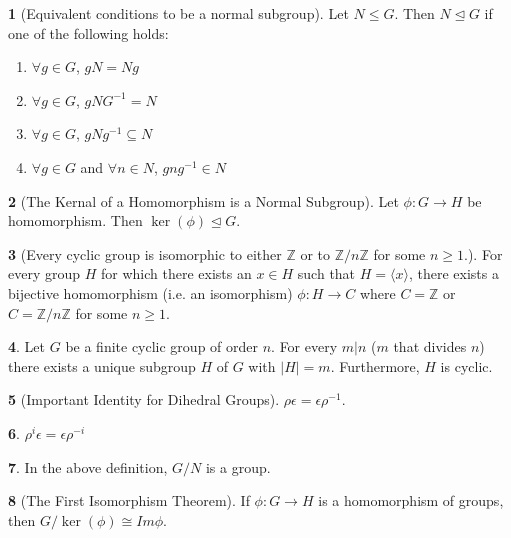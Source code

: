 \documentclass[12pt]{article}
\theoremstyle{definition}
\newtheorem{theorem}{\color{ForestGreen}{\textbf{Theorem}}}
\newcommand{\e}{\epsilon}
\begin{document}
\begin{theorem}[Equivalent conditions to be a normal subgroup]
Let $N \leq G$. Then $N \trianglelefteq G$ if one of the following holds:
\begin{enumerate}
\item $\forall g\in G$, $gN = Ng$
\item $\forall g\in G$, $gNG^{-1} = N$
\item $\forall g\in G$, $gNg^{-1} \subseteq N$
\item $\forall g\in G$ and $\forall n\in N$, $gng^{-1} \in N$
\end{enumerate}
\end{theorem}

\begin{theorem}[The Kernal of a Homomorphism is a Normal Subgroup]
Let $\phi : G \to H$ be homomorphism. Then $\ker (\phi) \trianglelefteq G$.
\end{theorem}

\begin{theorem}[Every cyclic group is isomorphic to either $\mathbb{Z}$ or to $\mathbb{Z} / n \mathbb{Z}$ for some $n \geq 1$.] For every group $H$ for which there exists an $x \in H$ such that $H = \langle x \rangle$, there exists a bijective homomorphism (i.e. an isomorphism) $\phi : H \to C$ where $C = \mathbb{Z}$ or $C = \mathbb{Z} / n \mathbb{Z}$ for some $n \geq 1$.
\end{theorem}

\begin{theorem}
Let $G$ be a finite cyclic group of order $n$. For every $m | n$ ($m$ that divides $n$) there exists a unique subgroup $H$ of $G$ with $|H|=m$. Furthermore, $H$ is cyclic.
\end{theorem}

\begin{theorem}[Important Identity for Dihedral Groups]
$\rho \e = \e \rho^{-1}$.
\end{theorem}

\begin{theorem}
$\rho^i \e = \e \rho^{-i}$
\end{theorem}

\begin{theorem}
In the above definition, $G/N$ is a group.
\end{theorem}

\begin{theorem}[The First Isomorphism Theorem]
If $\phi:G\to H$ is a homomorphism of groups, then $G / \ker(\phi) \cong Im \phi$.
\end{theorem}
\end{document}
